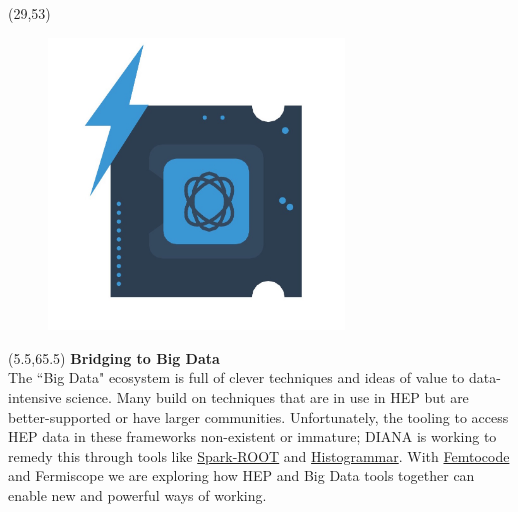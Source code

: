 \documentclass[final]{beamer}
\begin{document}
\begin{frame}{}
\begin{textblock}{12.5}(29,53)
\begin{figure}[tbph]
\centering
\includegraphics[width=0.7\textwidth]{images/faster-processing.jpg}
\end{figure}
\end{textblock}


\begin{textblock}{22.5}(5.5,65.5)
\textcolor{mybluelabel}{\bf Bridging to Big Data} \\
The ``Big Data" ecosystem is full of clever techniques and ideas of value to data-intensive science.
Many build on techniques that are in use in HEP but are better-supported or have larger communities.
Unfortunately, the tooling to access HEP data in these frameworks non-existent or immature;
DIANA is working to remedy this through tools like \href{https://github.com/diana-hep/spark-root}{Spark-ROOT} and \href{http://histogrammar.org/}{Histogrammar}.
With \href{https://github.com/diana-hep/femtocode}{Femtocode} and Fermiscope we are exploring how HEP and Big Data tools together can enable new and powerful ways of working.
\end{textblock}


\end{frame}
\end{document}
